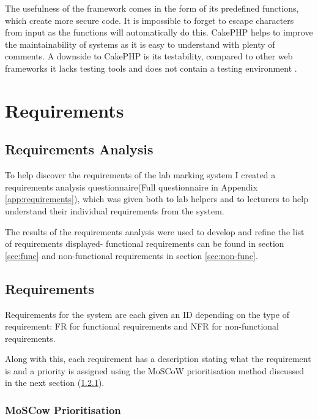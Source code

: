 \documentclass[11pt]{report}
\begin{document}
The usefulness of the framework comes in the form of its predefined functions, which create more secure code. It is impossible to forget to escape characters from input as the functions will automatically do this. CakePHP helps to improve the maintainability of systems as it is easy to understand with plenty of comments. A downside to CakePHP is its testability, compared to other web frameworks it lacks testing tools and does not contain a testing environment \cite{plekhanova_evaluating_2009-1}.





\newpage
\chapter{Requirements}\label{section:require}
 


\section{Requirements Analysis}
To help discover the requirements of the lab marking system I created a requirements analysis questionnaire(Full questionnaire in Appendix \ref{app:requirements}), which was given both to lab helpers and to lecturers to help understand their individual requirements from the system. 

The results of the requirements analysis were used to develop and refine the  list of requirements displayed- functional requirements can be found in section \ref{sec:func} and non-functional requirements in section \ref{sec:non-func}.



\section{Requirements}
\label{sec:requirements}
Requirements for the system are each given an ID depending on the type of requirement: FR for functional requirements and NFR for non-functional requirements.

Along with this, each requirement has a description stating what the requirement is and a priority is assigned using the MoSCoW prioritisation method discussed in the next section (\ref{sec:moscow}).


\subsection{MoSCow Prioritisation}
\label{sec:moscow}
\end{document}
